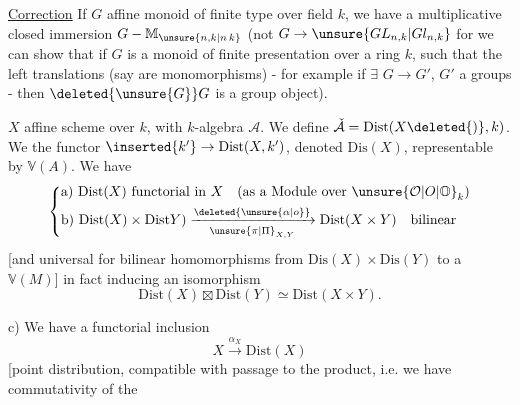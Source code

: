 \uline{Correction} \quad If $G$ affine monoid of finite type over field $k$, we have a multiplicative closed immersion $G\mathbin{-}\mathbb M_{\unsure{n,k|n\,k}}$ (not $G\to\unsure{GL_{n,k}|Gl_{n,k}}$\unsure{)} for we can show that if $G$ is a monoid of finite presentation over a ring $k$, such that the left translations (say are monomorphisms) - for example if $\exists$  $G\longrightarrow G'$, $G'$ a  groups - then $\deleted{\unsure{G}}G$ is a group object).


 $X$ affine scheme over $k$,  with $k$-algebra $\mathcal A$. We define $\check{\mathcal A}=\mathrm{Dist}(X\deleted{)},k)$. We  the functor $\inserted{k'}\rightarrow\mathrm{Dist}(X,k')$, denoted $\mathrm{Dis}(X)$, representable by $\mathbb V(A)$. We have
\reversemarginpar{}\normalmarginpar
\[
\left\{\begin{aligned}
&\text{a)}\ \mathrm{Dist}(X)\ \text{functorial in }X\quad
  (\text{as a Module over }\unsure{\mathcal O|O|\mathbb O}_k)\\
&\text{b)}\ \mathrm{Dist}(X)\times\mathrm{Dist}Y)
  \xrightarrow[\unsure{\pi|\Pi}_{X,Y}]{\deleted{\unsure{\alpha|o}}}
  \mathrm{Dist}(X\times Y)\quad\text{bilinear}
\end{aligned}\right.
\]
[and universal for bilinear homomorphisms from $\mathrm{Dis}(X)\times\mathrm{Dis}(Y)$ to a $\mathbb V(M)$] in fact inducing an isomorphism
\[
\mathrm{Dist}(X)\boxtimes\mathrm{Dist}(Y)\simeq\mathrm{Dist}(X\times Y).
\]

c) We have a functorial inclusion
\[
X\xrightarrow{\alpha_X}\mathrm{Dist}(X)
\]
[point distribution, compatible with passage to the product, i.e. we have commutativity of the

